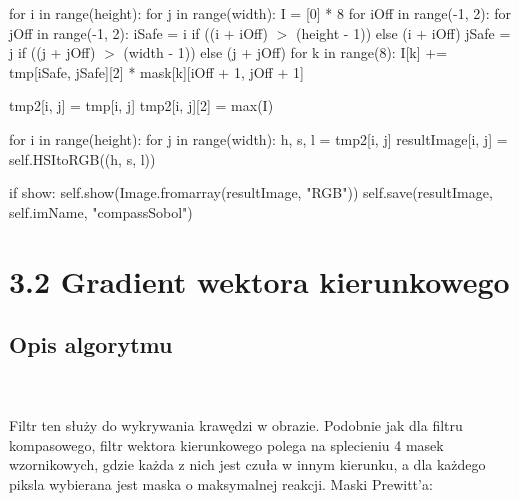 \documentclass[final,a4paper,openany,12pt]{mwbk}
\begin{document}
\indent \indent \indent for i in range(height): \newline
\indent \indent \indent for j in range(width): \newline
\indent \indent \indent I = [0] * 8 \newline
\indent \indent \indent for iOff in range(-1, 2): \newline
\indent \indent \indent for jOff in range(-1, 2): \newline
\indent \indent \indent iSafe = i if ((i + iOff) $>$ (height - 1)) else (i + iOff) \newline
\indent \indent \indent jSafe = j if ((j + jOff) $>$ (width - 1)) else (j + jOff) \newline
\indent \indent \indent for k in range(8): \newline
\indent \indent \indent I[k] += tmp[iSafe, jSafe][2] * mask[k][iOff + 1, jOff + 1] \newline

\indent \indent \indent tmp2[i, j] = tmp[i, j] \newline
\indent \indent \indent tmp2[i, j][2] = max(I) \newline

\indent \indent \indent for i in range(height): \newline
\indent \indent \indent for j in range(width): \newline
\indent \indent \indent h, s, l = tmp2[i, j] \newline
\indent \indent \indent resultImage[i, j] = self.HSItoRGB((h, s, l)) \newline

\indent \indent \indent if show: \newline
\indent \indent \indent self.show(Image.fromarray(resultImage, "RGB")) \newline
\indent \indent \indent self.save(resultImage, self.imName, "compassSobol") \newline

\newpage

\section*{3.2 Gradient wektora kierunkowego}
\subsection*{Opis algorytmu}
\hfill
\\\\
\indent Filtr ten służy do wykrywania krawędzi w obrazie. Podobnie jak dla filtru kompasowego, filtr wektora kierunkowego polega na splecieniu 4 masek wzornikowych, gdzie każda z nich jest czuła w innym kierunku, a dla każdego piksla wybierana jest maska o maksymalnej reakcji. Maski Prewitt'a:
\end{document}

